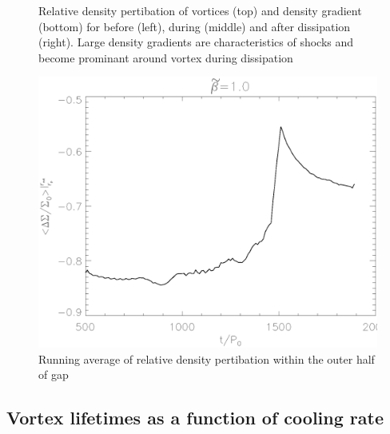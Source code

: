 \begin{figure}
{  }
\hfill
  \caption{Relative density pertibation of vortices (top) and density gradient
 (bottom) for before (left), during (middle) and after dissipation (right).
 Large density gradients are characteristics of shocks and become prominant
 around vortex during dissipation} \label{shockplot}
\end{figure}

\begin{figure}
    \includegraphics[width=\linewidth]{figures/gapdepth}
 \caption{Running average of relative density pertibation within the outer half
of gap} \label{gapdepth}
\end{figure}
\subsection{Vortex lifetimes as a function of cooling rate}

